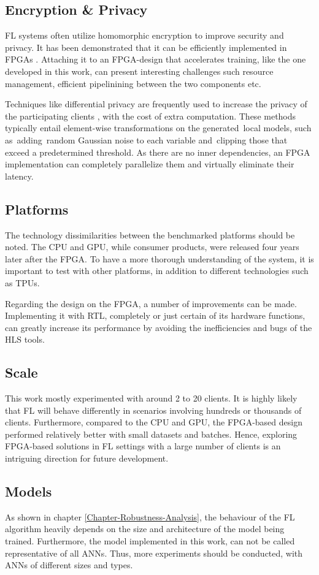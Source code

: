 \subsection{Encryption \& Privacy}
FL systems often utilize homomorphic encryption to improve security and privacy. It has been demonstrated that it can be efficiently implemented in FPGAs \cite{FPGA_encryption_for_FL}. Attaching it to an FPGA-design that accelerates training, like the one developed in this work, can present interesting challenges such resource management, efficient pipelinining between the two components etc.

Techniques like differential privacy are frequently used to increase the privacy of the participating clients \cite{Wei2020}, with the cost of extra computation. These methods typically entail element-wise transformations on the generated local models, such as adding random Gaussian noise to each variable and clipping those that exceed a predetermined threshold. As there are no inner dependencies, an FPGA implementation can completely parallelize them and virtually eliminate their latency.

\subsection{Platforms}
The technology dissimilarities between the benchmarked platforms should be noted. The CPU and GPU, while consumer products, were released four years later after the FPGA. To have a more thorough understanding of the system, it is important to test with other platforms, in addition to different technologies such as TPUs.

Regarding the design on the FPGA, a number of improvements can be made. Implementing it with RTL, completely or just certain of its hardware functions, can greatly increase its performance by avoiding the inefficiencies and bugs of the HLS tools.

\subsection{Scale}
This work mostly experimented with around 2 to 20 clients. It is highly likely that FL will behave differently in scenarios involving hundreds or thousands of clients. Furthermore, compared to the CPU and GPU, the FPGA-based design performed relatively better with small datasets and batches. Hence, exploring FPGA-based solutions in FL settings with a large number of clients is an intriguing direction for future development.

\subsection{Models}
As shown in chapter \ref{Chapter-Robustness-Analysis}, the behaviour of the FL algorithm heavily depends on the size and architecture of the model being trained. Furthermore, the model implemented in this work, can not be called representative of all ANNs.  Thus, more experiments should be conducted, with ANNs of different sizes and types.